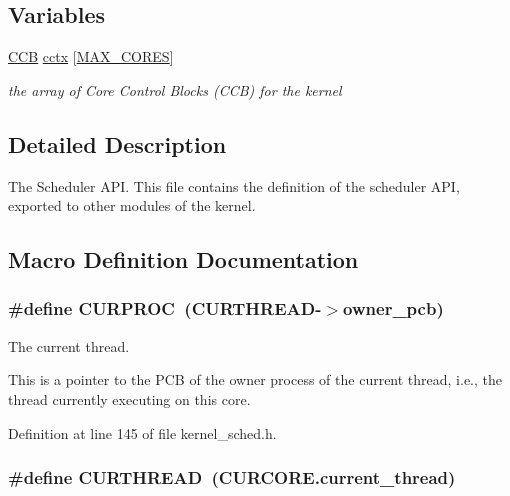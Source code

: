 \subsection*{Variables}
\begin{DoxyCompactItemize}
\item 
\hypertarget{group__scheduler_ga3be3b151b275926dff3fb99bee765eab}{\hyperlink{group__scheduler_ga7485b31e0dd9fd723bc2d75fba5206a0}{C\-C\-B} \hyperlink{group__scheduler_ga3be3b151b275926dff3fb99bee765eab}{cctx} \mbox{[}\hyperlink{bios_8h_a009855593b59738d24dbfc236edb3b14}{M\-A\-X\-\_\-\-C\-O\-R\-E\-S}\mbox{]}}\label{group__scheduler_ga3be3b151b275926dff3fb99bee765eab}

\begin{DoxyCompactList}\small\item\em the array of Core Control Blocks (C\-C\-B) for the kernel \end{DoxyCompactList}\end{DoxyCompactItemize}


\subsection{Detailed Description}
The Scheduler A\-P\-I. This file contains the definition of the scheduler A\-P\-I, exported to other modules of the kernel. 

\subsection{Macro Definition Documentation}
\hypertarget{group__scheduler_gae3437e8e6787ef05b6576d03c5b6a0ca}{
\subsubsection[{C\-U\-R\-P\-R\-O\-C}]{\setlength{\rightskip}{0pt plus 5cm}\#define C\-U\-R\-P\-R\-O\-C~({\bf C\-U\-R\-T\-H\-R\-E\-A\-D}-\/$>$owner\-\_\-pcb)}}\label{group__scheduler_gae3437e8e6787ef05b6576d03c5b6a0ca}


The current thread. 

This is a pointer to the P\-C\-B of the owner process of the current thread, i.\-e., the thread currently executing on this core. 

Definition at line 145 of file kernel\-\_\-sched.\-h.

\hypertarget{group__scheduler_ga587a82c8931f0df72f43cc913ceb7e27}{
\subsubsection[{C\-U\-R\-T\-H\-R\-E\-A\-D}]{\setlength{\rightskip}{0pt plus 5cm}\#define C\-U\-R\-T\-H\-R\-E\-A\-D~(C\-U\-R\-C\-O\-R\-E.\-current\-\_\-thread)}}\label{group__scheduler_ga587a82c8931f0df72f43cc913ceb7e27}


